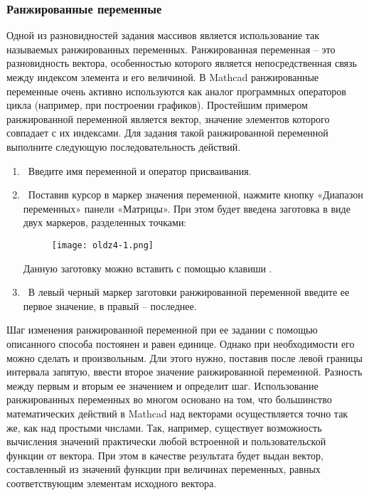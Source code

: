 \subsubsection*{Ранжированные переменные}
Одной из разновидностей задания массивов является использование так называемых ранжированных переменных. Ранжированная переменная – это разновидность вектора, особенностью которого является непосредственная связь между индексом элемента и его величиной. В Mathcad ранжированные переменные очень активно используются как аналог программных операторов цикла (например, при построении графиков).
Простейшим примером ранжированной переменной является вектор, значение элементов которого совпадает с их индексами. Для задания такой ранжированной переменной выполните следующую последовательность действий.
\begin{enumerate}
	\item Введите имя переменной и оператор присваивания.
	\item  Поставив курсор в маркер значения переменной, нажмите кнопку «Диапазон переменных» панели «Матрицы». При этом будет введена заготовка в виде двух маркеров, разделенных точками:
	\begin{figure}[h]
		\begin{center}
			\texttt{[image: oldz4-1.png]}
		\end{center}
	\end{figure}
		
	Данную заготовку можно вставить с помощью клавиши \keys{;}.
	
	\item  В левый черный маркер заготовки ранжированной переменной введите ее первое значение, в правый – последнее.
\end{enumerate}

Шаг изменения ранжированной переменной при ее задании с помощью описанного способа постоянен и равен единице. Однако при необходимости его можно сделать и произвольным. Дли этого нужно, поставив после левой границы интервала запятую, ввести второе значение ранжированной переменной. Разность между первым и вторым ее значением и определит шаг. 
Использование ранжированных переменных во многом основано на том, что большинство математических действий в Mathcad над векторами осуществляется точно так же, как над простыми числами. Так, например, существует возможность вычисления значений практически любой встроенной и пользовательской функции от вектора. При этом в качестве результата будет выдан вектор, составленный из значений функции при величинах переменных, равных соответствующим элементам исходного вектора.

